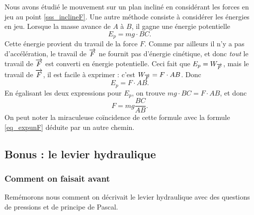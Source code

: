 Nous avons étudié le mouvement sur un plan incliné en considérant les forces en jeu au point \ref{sss_inclineF}. Une autre méthode consiste à considérer les énergies en jeu. Lorsque la masse avance de $A$ à $B$, il gagne une énergie potentielle 
\[ 
 E_p=mg\cdot BC. 
\]
Cette énergie provient du travail de la force $F$. Comme par ailleurs il n'y a pas d'accélération, le travail de $\overrightarrow{F}$ ne fournit pas d'énergie cinétique, et donc \emph{tout} le travail de $\overrightarrow{F}$ est converti en énergie potentielle. Ceci fait que $E_p=W_{\overrightarrow{F}}$, mais le travail de $\overrightarrow{F}$, il est facile à exprimer : c'est $W_{\overrightarrow{F}}=F\cdot AB$. Donc
\[ 
  E_p=F\cdot AB.
\]
En égalisant les deux expressions pour $E_p$, on trouve $mg\cdot BC=F\cdot AB$, et donc
\begin{equation}  \label{eq_expdeuxF}
  F=mg\frac{ BC}{ AB }.
\end{equation}
On peut noter la miraculeuse coïncidence de cette formule avec la formule \eqref{eq_expunF} déduite par un autre chemin. 

\subsection{Bonus : le levier hydraulique}

\subsubsection{Comment on faisait avant}

Remémorons nous comment on décrivait le levier hydraulique avec des questions de pressions et de principe de Pascal.


